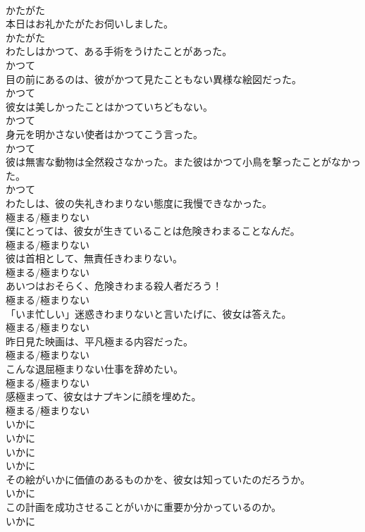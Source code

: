 \documentclass[8pt]{extreport}
\begin{document}
\begin{CJK}{UTF8}{min}
\\	かたがた
\\	本日はお礼かたがたお伺いしました。	
\\	かたがた
\\	わたしはかつて、ある手術をうけたことがあった。	
\\	かつて
\\	目の前にあるのは、彼がかつて見たこともない異様な絵図だった。	
\\	かつて
\\	彼女は美しかったことはかつていちどもない。	
\\	かつて
\\	身元を明かさない使者はかつてこう言った。	
\\	かつて
\\	彼は無害な動物は全然殺さなかった。また彼はかつて小鳥を撃ったことがなかった。	
\\	かつて
\\	わたしは、彼の失礼きわまりない態度に我慢できなかった。	
\\	極まる/極まりない
\\	僕にとっては、彼女が生きていることは危険きわまることなんだ。	
\\	極まる/極まりない
\\	彼は首相として、無責任きわまりない。	
\\	極まる/極まりない
\\	あいつはおそらく、危険きわまる殺人者だろう！	
\\	極まる/極まりない
\\	「いま忙しい」迷惑きわまりないと言いたげに、彼女は答えた。	
\\	極まる/極まりない
\\	昨日見た映画は、平凡極まる内容だった。	
\\	極まる/極まりない
\\	こんな退屈極まりない仕事を辞めたい。	
\\	極まる/極まりない
\\	感極まって、彼女はナプキンに顔を埋めた。	
\\	極まる/極まりない
\\	いかに 
\\	いかに 
\\	いかに 
\\	いかに
\\	その絵がいかに価値のあるものかを、彼女は知っていたのだろうか。	
\\	いかに
\\	この計画を成功させることがいかに重要か分かっているのか。	
\\	いかに

\end{CJK}
\end{document}
